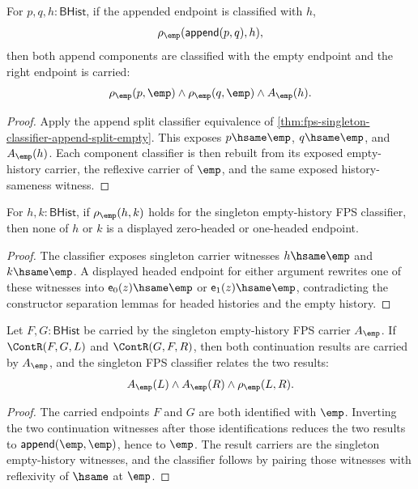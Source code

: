 \begin{theorem}
\label{thm:fps-singleton-classifier-append-component-classifiers}
For $p,q,h:\mathsf{BHist}$, if the appended endpoint is classified with $h$,
$$
\rho_{\emp}(\mathsf{append}(p,q),h),
$$
then both append components are classified with the empty endpoint and the
right endpoint is carried:
$$
\rho_{\emp}(p,\emp)\land \rho_{\emp}(q,\emp)\land A_{\emp}(h).
$$
\end{theorem}
\begin{proof}
Apply the append split classifier equivalence of
\autoref{thm:fps-singleton-classifier-append-split-empty}. This exposes
$p\hsame\emp$, $q\hsame\emp$, and $A_{\emp}(h)$. Each component classifier is
then rebuilt from its exposed empty-history carrier, the reflexive carrier of
$\emp$, and the same exposed history-sameness witness.
\end{proof}

\begin{theorem}
\label{thm:fps-singleton-classifier-headed-endpoint-absurd}
For $h,k:\mathsf{BHist}$, if
$\rho_{\emp}(h,k)$ holds for the singleton empty-history FPS classifier, then
none of $h$ or $k$ is a displayed zero-headed or one-headed endpoint.
\end{theorem}
\begin{proof}
The classifier exposes singleton carrier witnesses
$h\hsame\emp$ and $k\hsame\emp$. A displayed headed endpoint for either
argument rewrites one of these witnesses into
$\mathsf{e}_0(z)\hsame\emp$ or $\mathsf{e}_1(z)\hsame\emp$, contradicting
the constructor separation lemmas for headed histories and the empty history.
\end{proof}

\begin{theorem}
\label{thm:fps-singleton-empty-history-classifier-continuation-comm-closed}
Let $F,G:\mathsf{BHist}$ be carried by the singleton empty-history FPS carrier
$A_{\emp}$. If $\ContR(F,G,L)$ and $\ContR(G,F,R)$, then both continuation
results are carried by $A_{\emp}$, and the singleton FPS classifier relates
the two results:
$$
A_{\emp}(L)\land A_{\emp}(R)\land \rho_{\emp}(L,R).
$$
\end{theorem}
\begin{proof}
The carried endpoints $F$ and $G$ are both identified with $\emp$. Inverting
the two continuation witnesses after those identifications reduces the two
results to $\mathsf{append}(\emp,\emp)$, hence to $\emp$. The result carriers
are the singleton empty-history witnesses, and the classifier follows by
pairing those witnesses with reflexivity of $\hsame$ at $\emp$.
\end{proof}

